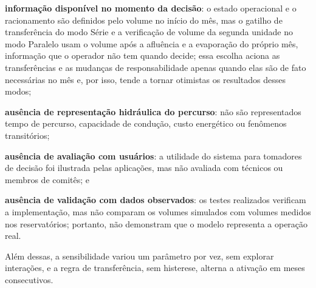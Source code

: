 \begin{alineas}
    \item \textbf{informação disponível no momento da decisão}: o estado operacional e o racionamento são definidos pelo volume no início do mês, mas o gatilho de transferência do modo Série e a verificação de volume da segunda unidade no modo Paralelo usam o volume após a afluência e a evaporação do próprio mês, informação que o operador não tem quando decide; essa escolha aciona as transferências e as mudanças de responsabilidade apenas quando elas são de fato necessárias no mês e, por isso, tende a tornar otimistas os resultados desses modos;
    \item \textbf{ausência de representação hidráulica do percurso}: não são representados tempo de percurso, capacidade de condução, custo energético ou fenômenos transitórios;
    \item \textbf{ausência de avaliação com usuários}: a utilidade do sistema para tomadores de decisão foi ilustrada pelas aplicações, mas não avaliada com técnicos ou membros de comitês; e
    \item \textbf{ausência de validação com dados observados}: os testes realizados verificam a implementação, mas não comparam os volumes simulados com volumes medidos nos reservatórios; portanto, não demonstram que o modelo representa a operação real.
\end{alineas}

Além dessas, a sensibilidade variou um parâmetro por vez, sem explorar interações, e a regra de transferência, sem histerese, alterna a ativação em meses consecutivos.

